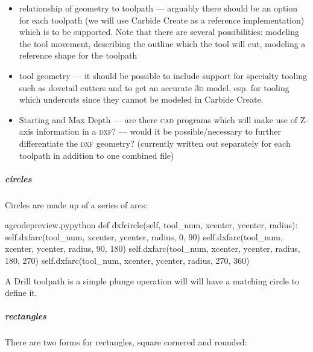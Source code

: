 \documentclass{ltxdoc}
\begin{document}
\begin{itemize}
 \item relationship of geometry to toolpath --- arguably there should be an option for each
       toolpath (we will use Carbide Create as a reference implementation) which is to be 
       supported. Note that there are several possibilities: modeling the tool movement,
       describing the outline which the tool will cut, modeling a reference shape for the toolpath
 \item tool geometry --- it should be possible to include support for specialty tooling 
       such as dovetail cutters and to get an accurate \textsc{3d} model, esp. for tooling which
       undercuts since they cannot be modeled in Carbide Create.
 \item Starting and Max Depth --- are there \textsc{cad} programs which will make use of Z-axis information 
       in a \textsc{dxf}? --- would it be possible/necessary to further differentiate the \textsc{dxf} geometry?
       (currently  written out separately for each toolpath in addition to one combined file)
\end{itemize}

\subparagraph{circles}

Circles are made up of a series of arcs:

\lstset{firstnumber=\thegcpy}
\begin{writecode}{a}{gcodepreview.py}{python}
    def dxfcircle(self, tool_num, xcenter, ycenter, radius):
        self.dxfarc(tool_num, xcenter, ycenter, radius,   0,  90)
        self.dxfarc(tool_num, xcenter, ycenter, radius,  90, 180)
        self.dxfarc(tool_num, xcenter, ycenter, radius, 180, 270)
        self.dxfarc(tool_num, xcenter, ycenter, radius, 270, 360)

\end{writecode}
\addtocounter{gcpy}{6}

A Drill toolpath is a simple plunge operation will will have a matching circle to define it.

\subparagraph{rectangles}

There are two forms for rectangles, square cornered and rounded:
\end{document}
